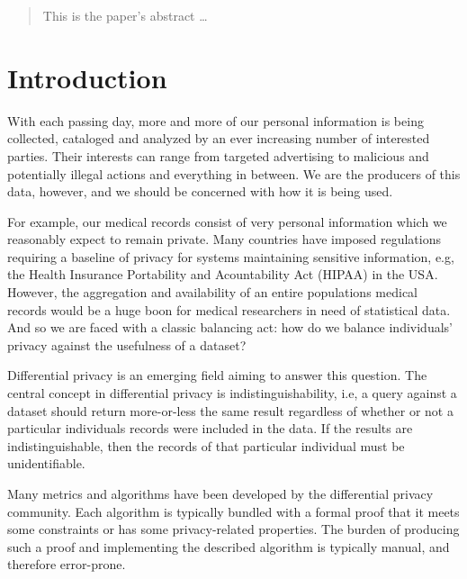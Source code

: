 \documentclass[12pt]{article}
\begin{document}
\maketitle

\lstset{language=Haskell}

\begin{abstract}
This is the paper's abstract \ldots
\end{abstract}

\section{Introduction}\label{sec:introduction}


With each passing day, more and more of our personal information is being collected, cataloged and analyzed by an ever increasing number of interested parties.
Their interests can range from targeted advertising to malicious and potentially illegal actions and everything in between.
We are the producers of this data, however, and we should be concerned with how it is being used.

For example, our medical records consist of very personal information which we reasonably expect to remain private.
Many countries have imposed regulations requiring a baseline of privacy for systems maintaining sensitive information, e.g, the Health Insurance Portability and Acountability Act (HIPAA) in the USA.
However, the aggregation and availability of an entire populations medical records would be a huge boon for medical researchers in need of statistical data.
And so we are faced with a classic balancing act: how do we balance individuals' privacy against the usefulness of a dataset?

Differential privacy\cite{journals/cacm/Dwork11} is an emerging field aiming to answer this question.
The central concept in differential privacy is indistinguishability, i.e, a query against a dataset should return more-or-less the same result regardless of whether or not a particular individuals records were included in the data.
If the results are indistinguishable, then the records of that particular individual must be unidentifiable.

Many metrics and algorithms have been developed by the differential privacy community.
Each algorithm is typically bundled with a formal proof that it meets some constraints or has some privacy-related properties.
The burden of producing such a proof and implementing the described algorithm is typically manual, and therefore error-prone.
\end{document}

